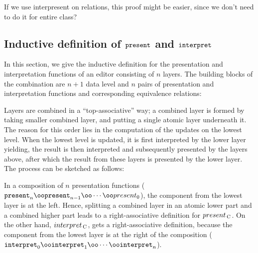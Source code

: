 If we use interpresent on relations, this proof might be easier, since we don't need to do it for entire class?

\ec

\subsection{Inductive definition of ${\tt present}$ and ${\tt interpret}$}

In this section, we give the inductive definition for the presentation and interpretation functions of an editor consisting of $n$ layers.  The building blocks of the combination are $n+1$ data level and $n$ pairs of presentation and interpretation functions and corresponding equivalence relations:


Layers are combined in a ``top-associative'' way; a combined layer is formed by taking smaller combined layer, and putting a  single atomic layer underneath it. The reason for this order lies in the computation of the updates on the lowest level. When the lowest level is updated, it is first interpreted by the lower layer yielding, the result is then interpreted and subsequently presented by the layers above, after which the result from these layers is presented by the lower layer. The process can be sketched as follows:


In a composition of $n$ presentation functions ($\present_n \oo \present_{n-1} \oo \cdots \oo present_0$), the component from the lowest layer is at the left. Hence, splitting a combined layer in an atomic lower part and a combined higher part leads to a right-associative definition for $present_{\, \mathrm C}$. On the other hand, $interpret_{\, \mathrm C}$, gets a right-associative definition, because the component from the lowest layer is at the right of the composition ($\interpret_0 \oo \interpret_1 \oo \cdots \oo \interpret_n$).

